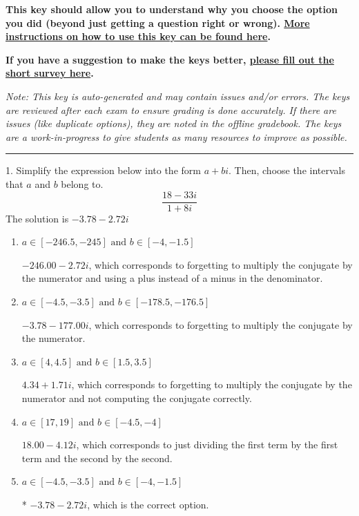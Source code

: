 \documentclass{extbook}[14pt]
\begin{document}
\textbf{This key should allow you to understand why you choose the option you did (beyond just getting a question right or wrong). \href{https://xronos.clas.ufl.edu/mac1105spring2020/courseDescriptionAndMisc/Exams/LearningFromResults}{More instructions on how to use this key can be found here}.}

\textbf{If you have a suggestion to make the keys better, \href{https://forms.gle/CZkbZmPbC9XALEE88}{please fill out the short survey here}.}

\textit{Note: This key is auto-generated and may contain issues and/or errors. The keys are reviewed after each exam to ensure grading is done accurately. If there are issues (like duplicate options), they are noted in the offline gradebook. The keys are a work-in-progress to give students as many resources to improve as possible.}

\rule{\textwidth}{0.4pt}

1. Simplify the expression below into the form $a+bi$. Then, choose the intervals that $a$ and $b$ belong to.
\[ \frac{18 - 33 i}{1 + 8 i} \] 
The solution is $ -3.78  - 2.72 i $ 

\begin{enumerate}[label=\Alph*.] 
\item $ a \in [-246.5, -245] \text{ and } b \in [-4, -1.5] $ 

  $-246.00  - 2.72 i$, which corresponds to forgetting to multiply the conjugate by the numerator and using a plus instead of a minus in the denominator. 
\item $ a \in [-4.5, -3.5] \text{ and } b \in [-178.5, -176.5] $ 

  $-3.78  - 177.00 i$, which corresponds to forgetting to multiply the conjugate by the numerator. 
\item $ a \in [4, 4.5] \text{ and } b \in [1.5, 3.5] $ 

  $4.34  + 1.71 i$, which corresponds to forgetting to multiply the conjugate by the numerator and not computing the conjugate correctly. 
\item $ a \in [17, 19] \text{ and } b \in [-4.5, -4] $ 

  $18.00  - 4.12 i$, which corresponds to just dividing the first term by the first term and the second by the second. 
\item $ a \in [-4.5, -3.5] \text{ and } b \in [-4, -1.5] $ 

 * $-3.78  - 2.72 i$, which is the correct option. 
\end{enumerate} 
 
\end{document}
